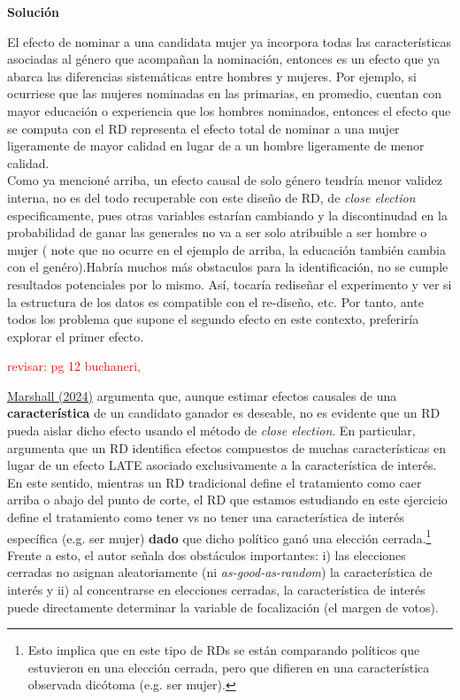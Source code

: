 \documentclass[a4paper, answers, addpoints, 11pt]{exam}
\newenvironment{solucion}{%
  \begin{mdframed}[
    backgroundcolor=blue!5,    %
    linecolor=blue!50,          %
    linewidth=2pt,              %
    leftmargin=10pt,            %
    rightmargin=8pt,           %
    topline=true,              %
    bottomline=true,            %
    roundcorner=10pt,           %
    innerleftmargin=10pt,       %
    innerrightmargin=10pt,      %
    innerbottommargin=10pt,     %
    innertopmargin=10pt         %
  ]%
  \begin{tcolorbox}[colframe=blue!50!black, colback=blue!50, coltitle=white, sharp corners=all, boxrule=1mm, width=\textwidth, halign=left, valign=center, top=0mm, bottom=0mm, left=0mm, right=0mm] \textbf{Solución} \end{tcolorbox} }{\end{mdframed}}
\begin{document}
\begin{enumerate}[resume]
\begin{enumerate}
\begin{solucion}
El efecto de nominar a una candidata mujer ya incorpora todas las características asociadas al género que acompañan la nominación, entonces es un efecto que ya abarca las diferencias sistemáticas entre hombres y mujeres. Por ejemplo, si ocurriese que las mujeres nominadas en las primarias, en promedio, cuentan con mayor educación o experiencia que los hombres nominados, entonces el efecto que se computa con el RD representa el efecto total de nominar a una mujer ligeramente de mayor calidad en lugar de a un hombre ligeramente de menor calidad.\\

Como ya mencioné arriba, un efecto causal de solo género tendría menor validez interna, no es del todo recuperable  con este diseño de RD, de \textit{close election } especificamente, pues otras variables estarían cambiando y la discontinudad en la probabilidad de ganar las generales no va a ser solo atribuible a ser hombre o mujer ( note que no ocurre en el ejemplo de arriba, la educación también cambia con el genéro).Habría muchos más obstaculos para la identificación, no se cumple resultados potenciales por lo mismo.  Así, tocaría rediseñar el experimento y ver si la estructura de los datos es compatible con el re-diseño, etc. Por tanto, ante todos los problema que supone el segundo efecto en este contexto, preferiría explorar el primer efecto.

\textcolor{red}{revisar: pg 12 buchaneri, }
\end{solucion}        
    \end{enumerate}
  
    
\end{enumerate}

\bigskip
    
\href{https://onlinelibrary-wiley-com.ezproxy.uniandes.edu.co/doi/full/10.1111/ajps.12741}{Marshall (2024)} argumenta que, aunque estimar efectos causales de una \textbf{característica} de un candidato ganador es deseable, no es evidente que un RD pueda aislar dicho efecto usando el método de \textit{close election}. En particular, argumenta que un RD identifica efectos compuestos de muchas características en lugar de un efecto LATE asociado exclusivamente a la característica de interés. \\

En este sentido, mientras un RD tradicional define el tratamiento como caer arriba o abajo del punto de corte, el RD que estamos estudiando en este ejercicio define el tratamiento como tener vs no tener una característica de interés específica (e.g. ser mujer) \textbf{dado} que dicho político ganó una elección cerrada.\footnote{Esto implica que en este tipo de RDs se están comparando políticos que estuvieron en una elección cerrada, pero que difieren en una característica observada dicótoma (e.g. ser mujer).} Frente a esto, el autor señala dos obstáculos importantes: i) las elecciones cerradas no asignan aleatoriamente (ni \textit{as-good-as-random}) la característica de interés y ii) al concentrarse en elecciones cerradas, la característica de interés puede directamente determinar la variable de focalización (el margen de votos). \\
\end{document}
